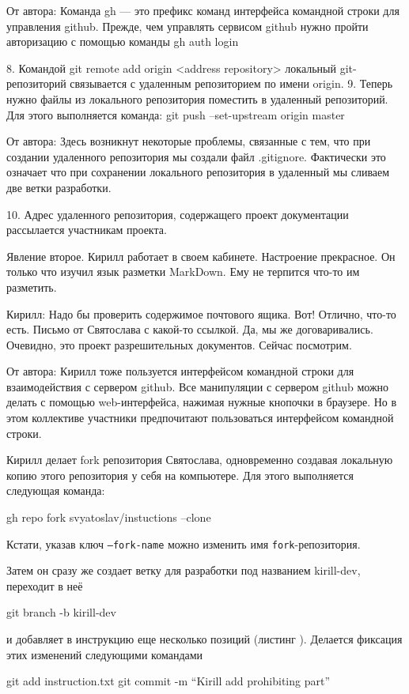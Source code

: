 \documentclass{play}
\begin{document}
От автора:
 Команда gh --- это префикс команд интерфейса командной строки для управления
github. Прежде, чем управлять сервисом github нужно пройти авторизацию с помощью команды
  gh auth login

8. Командой 
	git remote add origin <address repository>
локальный git-репозиторий связывается с удаленным репозиторием по имени origin.
9. Теперь нужно файлы из локального репозитория поместить в удаленный репозиторий. Для этого
выполняется команда:
	git push --set-upstream origin master

От автора:
Здесь возникнут некоторые проблемы, связанные с тем, что при создании 
удаленного репозитория мы создали файл .gitignore. Фактически это означает что 
при сохранении локального репозитория в удаленный мы сливаем две ветки разработки.

10. Адрес удаленного репозитория, содержащего проект документации рассылается участникам
проекта. 

Явление второе.
Кирилл работает в своем кабинете. Настроение прекрасное. Он только что изучил язык разметки
MarkDown. Ему не терпится что-то им разметить. 

Кирилл: Надо бы проверить содержимое почтового ящика. Вот! Отлично, что-то есть. 
Письмо от Святослава с какой-то ссылкой. Да, мы же договаривались. Очевидно, это проект
разрешительных документов. Сейчас посмотрим.

От автора: Кирилл тоже пользуется интерфейсом командной строки для взаимодействия с сервером
github. Все манипуляции с сервером github можно делать с помощью web-интерфейса, нажимая
	нужные кнопочки в браузере. Но в этом коллективе участники предпочитают пользоваться интерфейсом
командной строки. 

Кирилл делает fork репозитория Святослава, одновременно
создавая локальную копию этого репозитория у себя на компьютере. Для этого выполняется следующая
команда:

gh repo fork svyatoslav/instuctions --clone

Кстати, указав ключ \texttt{--fork-name} можно изменить имя \texttt{fork}-репозитория.

Затем он сразу же создает ветку для разработки под названием kirill-dev, переходит в  неё 

git branch -b kirill-dev

и добавляет в инструкцию еще несколько позиций (листинг ).
Делается фиксация этих изменений следующими командами

git add instruction.txt
git commit -m ``Kirill add prohibiting part''
\end{document}
